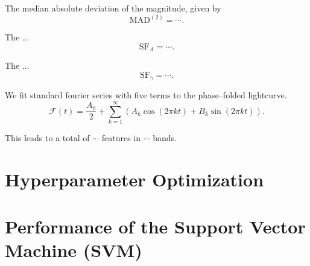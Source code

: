 \begin{enumerate}
 The median absolute deviation of the magnitude, given by
\begin{equation}\text{MAD}^{(2)} = \cdots.\end{equation}

 The ...
\begin{equation}\text{SF}_A = \cdots.\end{equation}

 The ...
\begin{equation}\text{SF}_\gamma = \cdots.\end{equation}

 We fit standard fourier series with five terms to the phase--folded lightcurve.
\begin{equation}\mathcal{F}(t) = \frac{A_0}{2} + \sum_{k=1}^{\infty} ( A_k \cos(2 \pi k t) + B_k \sin(2 \pi k t) ).\end{equation}



\end{enumerate}

This leads to a total of $\cdots$ features in $\cdots$ bands.


\section{Hyperparameter Optimization}


\section{Performance of the Support Vector Machine (SVM)}



